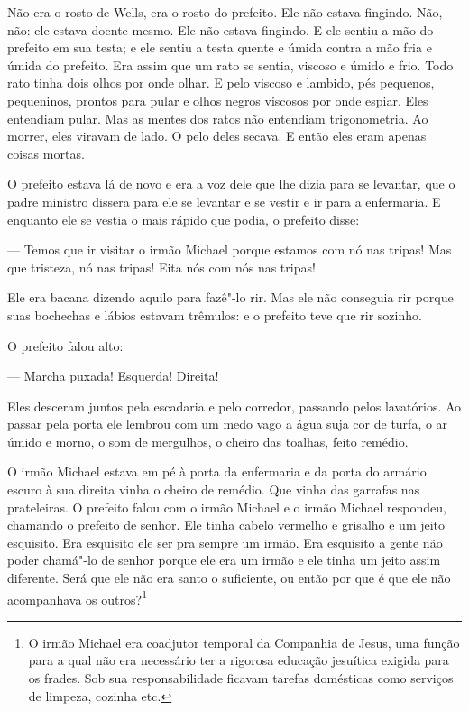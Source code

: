 Não era o rosto de Wells, era o rosto do prefeito. Ele não estava
fingindo. Não, não: ele estava doente mesmo. Ele não estava fingindo. E
ele sentiu a mão do prefeito em sua testa; e ele sentiu a testa quente
e úmida contra a mão fria e úmida do prefeito. Era assim que um rato se
sentia, viscoso e úmido e frio. Todo rato tinha dois olhos por onde
olhar. E pelo viscoso e lambido, pés pequenos, pequeninos, prontos para
pular e olhos negros viscosos por onde espiar. Eles entendiam pular.
Mas as mentes dos ratos não entendiam trigonometria. Ao morrer, eles
viravam de lado. O pelo deles secava. E então eles eram apenas coisas
mortas.

O prefeito estava lá de novo e era a voz dele que lhe dizia para se
levantar, que o padre ministro dissera para ele se levantar e se vestir 
e ir para a enfermaria. E enquanto ele se vestia o mais rápido que podia,
o prefeito disse:

--- Temos que ir visitar o irmão Michael porque estamos com nó nas
tripas! Mas que tristeza, nó nas tripas! Eita nós com nós nas tripas!

Ele era bacana dizendo aquilo para fazê"-lo rir. Mas ele não conseguia rir
porque suas bochechas e lábios estavam trêmulos: e o prefeito teve que
rir sozinho.

O prefeito falou alto:

 --- Marcha puxada! Esquerda! Direita!

Eles desceram juntos pela escadaria e pelo corredor, passando pelos
lavatórios. Ao passar pela porta ele lembrou com um medo vago a água
suja cor de turfa, o ar úmido e morno, o som de mergulhos, o cheiro das
toalhas, feito remédio.

O irmão Michael estava em pé à porta da enfermaria e da porta do armário
escuro à sua direita vinha o cheiro de remédio. Que vinha das garrafas nas
prateleiras. O prefeito falou com o irmão Michael e o irmão Michael
respondeu, chamando o prefeito de senhor. Ele tinha cabelo vermelho e
grisalho e um jeito esquisito. Era esquisito ele ser pra sempre um
irmão. Era esquisito a gente não poder chamá"-lo de senhor porque ele
era um irmão e ele tinha um jeito assim diferente. Será que ele não era
santo o suficiente, ou então por que é que ele não acompanhava os
outros?\footnote{ O irmão Michael era coadjutor temporal da Companhia de
Jesus, uma função para a qual não era necessário ter a rigorosa
educação jesuítica exigida para os frades. Sob sua responsabilidade
ficavam tarefas domésticas como serviços de limpeza, cozinha etc.}


